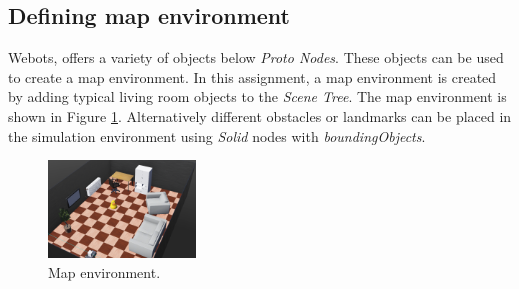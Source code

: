 \documentclass[11pt]{article}
\begin{document}
    \subsection{Defining map environment}
    Webots, offers a variety of objects below \emph{Proto Nodes}. These objects can be used to create a map environment. In this assignment, a map environment is created by adding typical living room objects to the \emph{Scene Tree}. The map environment is shown in Figure \ref{fig:map}.
    Alternatively different obstacles or landmarks can be placed in the simulation environment using \emph{Solid} nodes with \emph{boundingObjects}.  
    \begin{figure}[ht!]
        \centering
        \includegraphics[width = 0.35\textwidth]{map.PNG}
        \caption{Map environment.}
        \label{fig:map}
    \end{figure}
\end{document}
